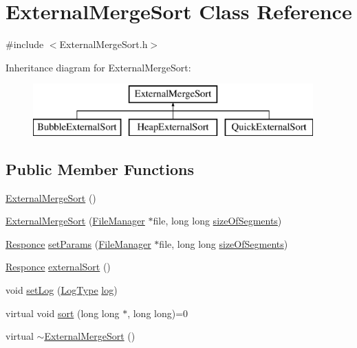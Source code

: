 \hypertarget{class_external_merge_sort}{}\section{External\+Merge\+Sort Class Reference}
\label{class_external_merge_sort}


{\ttfamily \#include $<$External\+Merge\+Sort.\+h$>$}

Inheritance diagram for External\+Merge\+Sort\+:\begin{figure}[H]
\begin{center}
\leavevmode
\includegraphics[height=2.000000cm]{class_external_merge_sort}
\end{center}
\end{figure}
\subsection*{Public Member Functions}
\begin{DoxyCompactItemize}
\item 
\hyperlink{class_external_merge_sort_a7b6efcd2abbf59a8983f972c52d04650}{External\+Merge\+Sort} ()
\item 
\hyperlink{class_external_merge_sort_a37df182916b341d5466f2fff0d50dfed}{External\+Merge\+Sort} (\hyperlink{class_file_manager}{File\+Manager} $\ast$file, long long \hyperlink{class_external_merge_sort_a1d68bb5e0373cf16807a41272dff1a99}{size\+Of\+Segments})
\item 
\hyperlink{_structures_8h_a9864d6ef28dd6e38416afac4426b3491}{Responce} \hyperlink{class_external_merge_sort_a2a27571acdf4f42e34798663e37f5e0b}{set\+Params} (\hyperlink{class_file_manager}{File\+Manager} $\ast$file, long long \hyperlink{class_external_merge_sort_a1d68bb5e0373cf16807a41272dff1a99}{size\+Of\+Segments})
\item 
\hyperlink{_structures_8h_a9864d6ef28dd6e38416afac4426b3491}{Responce} \hyperlink{class_external_merge_sort_aa0d80e41effe3a13c0d63b33e208918f}{external\+Sort} ()
\item 
void \hyperlink{class_external_merge_sort_ac0eeaba67ee0703acf73a8a5bf78ebe1}{set\+Log} (\hyperlink{_structures_8h_af67907baa897e9fb84df0cb89795b87c}{Log\+Type} \hyperlink{class_external_merge_sort_a41f61c3beb7dc529d7f2a8b2b4ee380b}{log})
\item 
virtual void \hyperlink{class_external_merge_sort_af6412221cc797a846243a343ccc12dba}{sort} (long long $\ast$, long long)=0
\item 
virtual \hyperlink{class_external_merge_sort_adfee7073120e0ae832c96977440b2fb4}{$\sim$\+External\+Merge\+Sort} ()
\end{DoxyCompactItemize}
